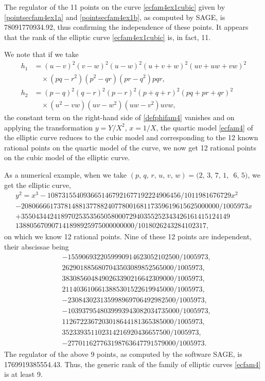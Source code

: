 \documentclass[11pt, leqno]{article}
\begin{document}
The regulator of the  11 points on the curve \eqref{ecfam4ex1cubic} given by \eqref{pointsecfam4ex1a} and \eqref{pointsecfam4ex1b}, as computed by SAGE, is  78091770934.92, thus confirming the independence of these points. It appears that the rank of the elliptic curve \eqref{ecfam4ex1cubic} is, in fact,  11. 

We note that if we take 
\begin{equation}
\begin{aligned} h_1&= (u-v)^2(v-w)^2(u-w)^2(u+v+w)^2(uv+uw+vw)^2\\
& \quad \times (pq-r^2)(p^2-qr)(pr-q^2)pqr,\\
 h_2 &=(p-q)^2(q-r)^2(p-r)^2(p+q+r)^2(pq+pr+qr)^2\\
 & \quad \times (u^2-vw)(uv-w^2)(uw-v^2)uvw,
\end{aligned}
\label{valhfam4}
\end{equation}
 the constant term on the right-hand side of \eqref{defphifam4} vanishes and on applying the transformation $y=Y/X^2,\,x=1/X$,  the quartic model \eqref{ecfam4} of the elliptic curve reduces to the  cubic model and corresponding to the 12 known rational points on the quartic model of the curve, we now get 12 rational points on the cubic model of the elliptic curve. 

As a numerical example, when  we  take $(p,\,q,\,r,\,u,\,v,\,w)=(2,\,3,\,7,\,1,\,$ $ 6,\,5)$,   we get the elliptic curve,
\begin{multline*}
y^2=x^3 - 1087315540936651467921677192224906456/1011981676729x^2\\
 - 2080666617378148813778824077800168117359619615625000000/1005973x\\
 + 3550434424189702535356505800072940355252343426161415124149\\
138805670907141898925975000000000/1018026243284102317, \label{ecfam4ex2}
\end{multline*}
on which we know  12 rational points. Nine of these 12 points are independent, their abscissae being 
\begin{equation*}
\begin{aligned}
&-1559069322059990914623052102500/1005973, \\ 
&2629018856807043503089852565000/1005973, \\
&3830856048490263390216642309000/1005973,\\ 
&2114036106613885301522619945000/1005973, \\
&-230843023135998969706492982500/1005973, \\
&-1039379548039993943082034735000/1005973,\\ 
&1126722367203018644181365385000/1005973, \\
&352339351102314216920436657500/1005973, \\
&-277011627763198763647791579000/1005973.
\end{aligned}
\end{equation*}
The  regulator of the above 9 points, as computed by the software SAGE, is 1769919385554.43. Thus, the generic rank of the family of elliptic curves \eqref{ecfam4} is at least 9.
\end{document}

